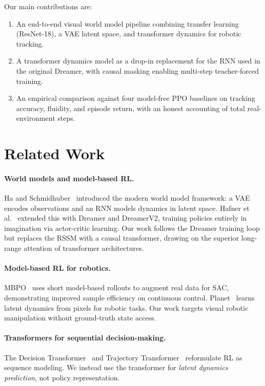 \documentclass{article}
\begin{document}
Our main contributions are:
\begin{enumerate}
  \item An end-to-end visual world model pipeline combining transfer learning (ResNet-18),
        a VAE latent space, and transformer dynamics for robotic tracking.
  \item A transformer dynamics model as a drop-in replacement for the RNN used in
        the original Dreamer, with causal masking enabling multi-step teacher-forced training.
  \item An empirical comparison against four model-free PPO baselines on tracking accuracy,
        fluidity, and episode return, with an honest accounting of total real-environment steps.
\end{enumerate}


\section{Related Work}

\paragraph{World models and model-based RL.}
Ha and Schmidhuber~\cite{ha2018worldmodels} introduced the modern world model framework:
a VAE encodes observations and an RNN models dynamics in latent space.
Hafner et al.~\cite{hafner2019dreamer,hafner2020dreamerv2} extended this with Dreamer
and DreamerV2, training policies entirely in imagination via actor-critic learning.
Our work follows the Dreamer training loop but replaces the RSSM with a causal
transformer, drawing on the superior long-range attention of transformer architectures.

\paragraph{Model-based RL for robotics.}
MBPO~\cite{janner2019mbpo} uses short model-based rollouts to augment real data for
SAC, demonstrating improved sample efficiency on continuous control.
Planet~\cite{hafner2019planet} learns latent dynamics from pixels for robotic tasks.
Our work targets visual robotic manipulation without ground-truth state access.

\paragraph{Transformers for sequential decision-making.}
The Decision Transformer~\cite{chen2021decisiontransformer} and Trajectory Transformer~\cite{janner2021tt}
reformulate RL as sequence modeling.
We instead use the transformer for \emph{latent dynamics prediction}, not policy representation.
\end{document}
